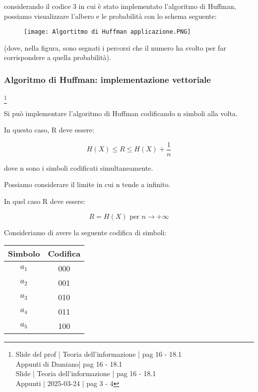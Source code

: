 considerando il codice 3 in cui è stato implementato l'algoritmo di Huffman, 
possiamo visualizzare l'albero e le probabilità con lo schema seguente: 

\begin{figure}[h]
    \centering
    \texttt{[image: Algortitmo di Huffman applicazione.PNG]}
\end{figure} 

(dove, nella figura, sono segnati i percorsi che il numero ha svolto per far corrispondere a quella probabilità). \newline 

\newpage 

\subsubsection{Algoritmo di Huffman: implementazione vettoriale}
\footnote{Slide del prof | Teoria dell'informazione | pag 16 - 18.1\\  
Appunti di Damiano| pag 16 - 18.1 \\
Slide | Teoria dell'informazione | pag 16 - 18.1 \\
Appunti | 2025-03-24 | pag 3 - 4
}

Si può implementare l'algoritmo di Huffman codificando n simboli alla volta. \newline 

In questo caso, R deve essere: 

{
    \Large
    \begin{equation}
        H(X) \le R \le H(X) + \frac{1}{n}
    \end{equation}
}

dove n sono i simboli codificati simultaneamente. \newline 

Possiamo considerare il limite in cui n tende a infinito. \newline 

In quel caso R deve essere: 

{
    \Large 
    \begin{equation}
        R = H(X) \text{ per } n \to + \infty
    \end{equation}
}

Consideriamo di avere la seguente codifica di simboli: 

{
    \Large 
    \begin{center}
        \begin{tabular}{|c c|}
            \hline
            \textbf{Simbolo} & \textbf{Codifica} \\
            \hline 
            \hline
            $a_1$ & 000 \\
            $a_2$ & 001 \\
            $a_3$ & 010 \\
            $a_4$ & 011 \\
            $a_5$ & 100 \\
            \hline
        \end{tabular}
    \end{center}
}

